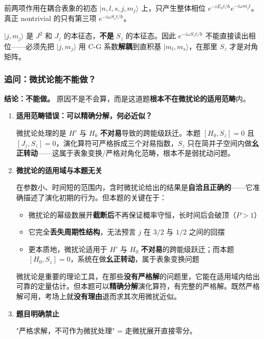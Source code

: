 前两项作用在耦合表象的初态 $|n,l,s,j,m_j\rangle$ 上，只产生整体相位 $e^{-iE_n t/\hbar}e^{-i\omega m_j t}$。真正 nontrivial 的只有第三项 $e^{-i\omega S_z t/\hbar}$。

\begin{tipbox}[关键观察]
$|j,m_j\rangle$ 是 $J^2$ 和 $J_z$ 的本征态，\textbf{不是} $S_z$ 的本征态。因此 $e^{-i\omega S_z t/\hbar}$ 不能直接读出相位——必须先把 $|j,m_j\rangle$ 用 C-G 系数\textbf{解耦}到直积基 $|m_l,m_s\rangle$，在那里 $S_z$ 才是对角矩阵。
\end{tipbox}

\subsubsection*{追问：微扰论能不能做？}

\textbf{结论：不能做。} 原因不是不会算，而是这道题\textbf{根本不在微扰论的适用范畴}内。

\begin{enumerate}[nosep]
    \item \textbf{适用范畴错误：可以精确分解，何必近似？}
    
    微扰论处理的是 $H'$ 与 $H_0$ \textbf{不对易}导致的跨能级跃迁。本题 $[H_0, S_z]=0$ 且 $[J_z, S_z]=0$，演化算符可严格拆成三个对易指数，$S_z$ 只在简并子空间内做\textbf{幺正转动}——这属于表象变换/严格对角化范畴，根本不是弱扰动问题。
    
    \item \textbf{微扰论的适用域与本题无关}
    
    在参数小、时间短的范围内，含时微扰论给出的结果是\textbf{自洽且正确的}——它准确描述了演化初期的行为。但本题的关键在于：
    \begin{itemize}[nosep]
        \item 微扰论的幂级数展开\textbf{截断后}不再保证概率守恒，长时间后会破顶（$P > 1$）
        \item 它完全\textbf{丢失周期性结构}，无法预言 $j$ 在 $3/2$ 与 $1/2$ 之间的回摆
        \item 更本质地，微扰论适用于 $H'$ 与 $H_0$ \textbf{不对易}的跨能级跃迁；而本题 $[H_0, S_z]=0$，系统在做\textbf{幺正转动}，属于表象变换问题
    \end{itemize}
    
    \begin{insightbox}[有严格解就不用微扰]
    微扰论是重要的理论工具，在那些\textbf{没有严格解}的问题里，它能在适用域内给出可靠的定量估计。但本题可以\textbf{精确分解}演化算符，有完整的严格解。既然严格解可用，考场上就\textbf{没有理由}退而求其次用微扰近似。
    \end{insightbox}
    
    \item \textbf{题目明确禁止}
    
    "严格求解，不可作为微扰处理" = 走微扰展开直接零分。
\end{enumerate}

